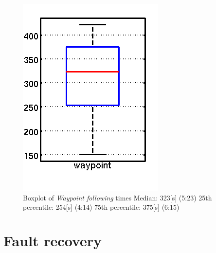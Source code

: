 \begin{figure}
\includegraphics[width=\textwidth]{Files/Figures/box_waypoint.png}
\caption[Box plot of waypoint]{Boxplot of \newline \textit{Waypoint following} times \newline
Median: 323[s] (5:23)\newline
25th percentile: 254[s] (4:14)\newline
75th percentile: 375[s] (6:15)}
\label{fig:box_waypoint}
\endminipage\hfill
\end{figure}

\newpage

\section{Fault recovery}
\label{sec:fault-recovery}

